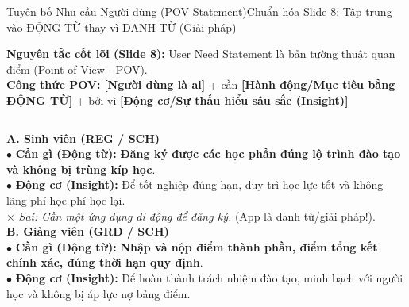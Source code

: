 \documentclass[aspectratio=169, 10pt]{beamer}
\begin{document}
\begin{frame}[t]{Tuyên bố Nhu cầu Người dùng (POV Statement)}{Chuẩn hóa Slide 8: Tập trung vào ĐỘNG TỪ thay vì DANH TỪ (Giải pháp)}
  \vspace{-0.15cm}
  \begin{tcolorbox}[colback=NavyDark!5!white, colframe=NavyDark, arc=1mm, boxrule=0.5pt, left=2mm, right=2mm, top=1mm, bottom=1mm]
    \centering\scriptsize
    \textbf{Nguyên tắc cốt lõi (Slide 8):} User Need Statement là bản tường thuật quan điểm (Point of View - POV).\\
    \textbf{Công thức POV:} {\color{NavyDark}\textbf{[Người dùng là ai]}} + cần {\color{PrimaryBlue}\textbf{[Hành động/Mục tiêu bằng ĐỘNG TỪ]}} + bởi vì {\color{SecondaryTeal}\textbf{[Động cơ/Sự thấu hiểu sâu sắc (Insight)]}}
  \end{tcolorbox}
  \vspace{-0.1cm}

  \begin{columns}[T]
      \begin{neutralBox}
        \scriptsize
        \textbf{\color{PrimaryBlue}A. Sinh viên (REG / SCH)}\\
        $\bullet$ \textbf{Cần gì (Động từ):} \textbf{Đăng ký được các học phần đúng lộ trình đào tạo và không bị trùng kíp học}.\\
        $\bullet$ \textbf{Động cơ (Insight):} Để tốt nghiệp đúng hạn, duy trì học lực tốt và không lãng phí học phí học lại.\\
        $\times$ \textit{Sai: Cần một ứng dụng di động để đăng ký.} (App là danh từ/giải pháp!).\\[0.1cm]
        \textbf{\color{SecondaryTeal}B. Giảng viên (GRD / SCH)}\\
        $\bullet$ \textbf{Cần gì (Động từ):} \textbf{Nhập và nộp điểm thành phần, điểm tổng kết chính xác, đúng thời hạn quy định}.\\
        $\bullet$ \textbf{Động cơ (Insight):} Để hoàn thành trách nhiệm đào tạo, minh bạch với người học và không bị áp lực nợ bảng điểm.
      \end{neutralBox}


\end{columns}
\end{frame}
\end{document}
